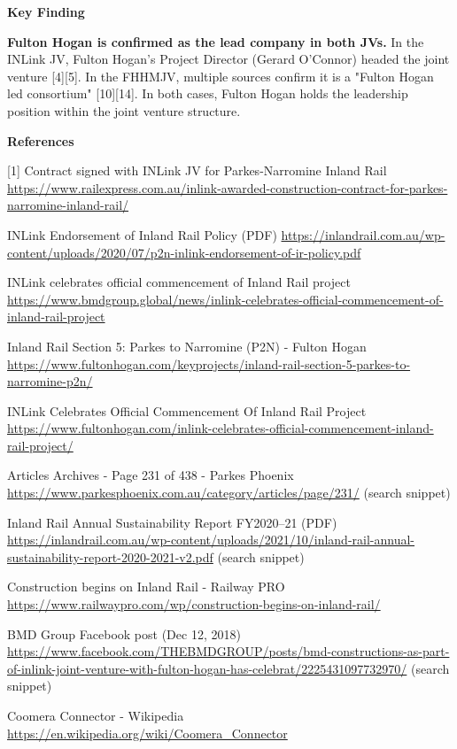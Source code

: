 \documentclass{llmxive}
\begin{document}
\begin{tcolorbox}
\smallskip\noindent\textbf{Key Finding}\par\smallskip

\textbf{Fulton Hogan is confirmed as the lead company in both JVs.} In the INLink JV, Fulton Hogan's Project Director (Gerard O'Connor) headed the joint venture [4][5]. In the FHHMJV, multiple sources confirm it is a "Fulton Hogan led consortium" [10][14]. In both cases, Fulton Hogan holds the leadership position within the joint venture structure.

\smallskip\noindent\textbf{References}\par\footnotesize
[1] Contract signed with INLink JV for Parkes-Narromine Inland Rail \url{https://www.railexpress.com.au/inlink-awarded-construction-contract-for-parkes-narromine-inland-rail/}\par
[2] INLink Endorsement of Inland Rail Policy (PDF) \url{https://inlandrail.com.au/wp-content/uploads/2020/07/p2n-inlink-endorsement-of-ir-policy.pdf}\par
[3] INLink celebrates official commencement of Inland Rail project \url{https://www.bmdgroup.global/news/inlink-celebrates-official-commencement-of-inland-rail-project}\par
[4] Inland Rail Section 5: Parkes to Narromine (P2N) - Fulton Hogan \url{https://www.fultonhogan.com/keyprojects/inland-rail-section-5-parkes-to-narromine-p2n/}\par
[5] INLink Celebrates Official Commencement Of Inland Rail Project \url{https://www.fultonhogan.com/inlink-celebrates-official-commencement-inland-rail-project/}\par
[6] Articles Archives - Page 231 of 438 - Parkes Phoenix \url{https://www.parkesphoenix.com.au/category/articles/page/231/} (search snippet)\par
[7] Inland Rail Annual Sustainability Report FY2020--21 (PDF) \url{https://inlandrail.com.au/wp-content/uploads/2021/10/inland-rail-annual-sustainability-report-2020-2021-v2.pdf} (search snippet)\par
[8] Construction begins on Inland Rail - Railway PRO \url{https://www.railwaypro.com/wp/construction-begins-on-inland-rail/}\par
[9] BMD Group Facebook post (Dec 12, 2018) \url{https://www.facebook.com/THEBMDGROUP/posts/bmd-constructions-as-part-of-inlink-joint-venture-with-fulton-hogan-has-celebrat/2225431097732970/} (search snippet)\par
[10] Coomera Connector - Wikipedia \url{https://en.wikipedia.org/wiki/Coomera_Connector}\par

\end{tcolorbox}
\end{document}
